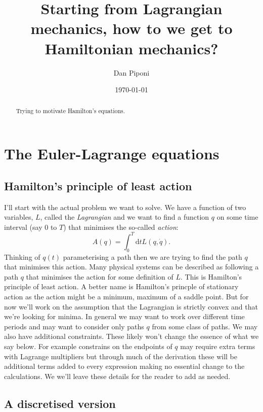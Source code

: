 \documentclass{article}
\begin{document}
\title{Starting from Lagrangian mechanics, how to we get to Hamiltonian mechanics?}
\author{Dan Piponi}
\date{\today}
\maketitle

\begin{abstract}
Trying to motivate Hamilton's equations.
\end{abstract}

\tableofcontents

\newcommand{\cD}{\mathcal{D}}
\newcommand{\rd}{\mathrm{d}}

\section{The Euler-Lagrange equations}
\subsection{Hamilton's principle of least action}
I'll start with the actual problem we want to solve.
We have a function of two variables, $L$, called the \emph{Lagrangian} and we want to find a function $q$ on some time interval (say $0$ to $T$) that minimises the so-called \emph{action}:
\[
A(q)=\int_0^T\rd tL(q,\dot{q}).
\]
Thinking of $q(t)$ parameterising a path then we are trying to find the path $q$ that minimises this action.
Many physical systems can be described as following a path $q$ that minimises the action for some definition of $L$.
This is Hamilton's principle of least action\cite{hamilton}.
A better name is Hamilton's princple of stationary action as the action might be a minimum, maximum of a saddle point.
But for now we'll work on the assumption that the Lagrangian is strictly convex and that we're looking for minima.
In general we may want to work over different time periods and may want to consider only paths $q$ from some class of paths.
We may also have additional constraints.
These likely won't change the essence of what we say below.
For example constrains on the endpoints of $q$ may require extra terms with Lagrange multipliers but through much of the derivation these will be additional terms added to every expression making no essential change to the calculations.
We we'll leave these details for the reader to add as needed.

\subsection{A discretised version}
\newcommand{\Min}{\mathop{\mathrm{Min}}}
\newcommand{\Max}{\mathop{\mathrm{Max}}}
\end{document}
